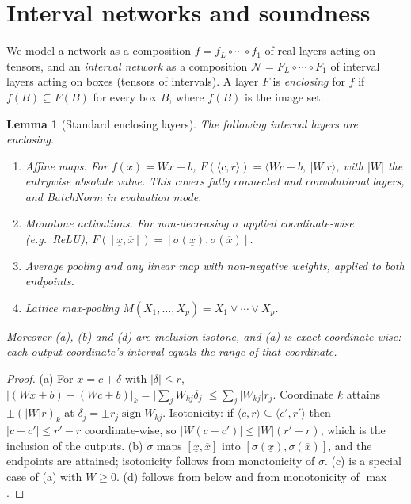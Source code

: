 \documentclass[preprint,12pt]{elsarticle}
\newtheorem{lemma}[theorem]{Lemma}
\theoremstyle{definition}
\newcommand{\lo}[1]{\underline{#1}}
\newcommand{\up}[1]{\overline{#1}}
\newcommand{\abs}[1]{\lvert #1\rvert}
\begin{document}
\section{Interval networks and soundness}
\label{sec:networks}

We model a network as a composition $f=f_L\circ\cdots\circ f_1$ of real layers acting on tensors, and an \emph{interval network} as a composition $\mathcal N=F_L\circ\cdots\circ F_1$ of interval layers acting on boxes (tensors of intervals). A layer $F$ is \emph{enclosing} for $f$ if $f(B)\subseteq F(B)$ for every box $B$, where $f(B)$ is the image set.

\begin{lemma}[Standard enclosing layers]\label{lem:layers}
The following interval layers are enclosing.
\begin{enumerate}[label=(\alph*)]
\item \emph{Affine maps.} For $f(x)=Wx+b$, $F(\langle c,r\rangle)=\langle Wc+b,\ \abs Wr\rangle$, with $\abs W$ the entrywise absolute value. This covers fully connected and convolutional layers, and BatchNorm in evaluation mode.
\item \emph{Monotone activations.} For non-decreasing $\sigma$ applied coordinate-wise (e.g.\ ReLU), $F([\lo x,\up x])=[\sigma(\lo x),\sigma(\up x)]$.
\item \emph{Average pooling} and any linear map with non-negative weights, applied to both endpoints.
\item \emph{Lattice max-pooling} $M(X_1,\dots,X_p)=X_1\vee\cdots\vee X_p$.
\end{enumerate}
Moreover (a), (b) and (d) are inclusion-isotone, and (a) is exact coordinate-wise: each output coordinate's interval equals the range of that coordinate.
\end{lemma}

\begin{proof}
(a) For $x=c+\delta$ with $\abs\delta\le r$, $\abs{(Wx+b)-(Wc+b)}_k=\abs{\sum_jW_{kj}\delta_j}\le\sum_j\abs{W_{kj}}r_j$. Coordinate $k$ attains $\pm(\abs Wr)_k$ at $\delta_j=\pm r_j\operatorname{sign}W_{kj}$. Isotonicity: if $\langle c,r\rangle\subseteq\langle c',r'\rangle$ then $\abs{c-c'}\le r'-r$ coordinate-wise, so $\abs{W(c-c')}\le\abs W(r'-r)$, which is the inclusion of the outputs. (b) $\sigma$ maps $[\lo x,\up x]$ into $[\sigma(\lo x),\sigma(\up x)]$, and the endpoints are attained; isotonicity follows from monotonicity of $\sigma$. (c) is a special case of (a) with $W\ge0$. (d) follows from  below and from monotonicity of $\max$.
\end{proof}
\end{document}
